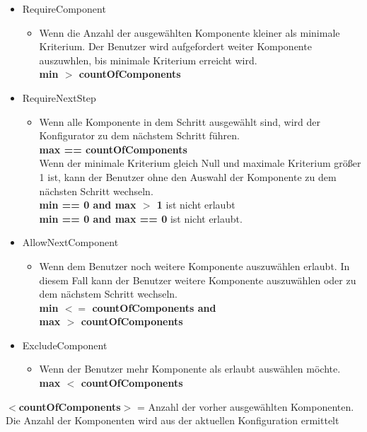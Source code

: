 \documentclass{article}
\begin{document}
\begin{itemize}
    \item RequireComponent 
    \begin{itemize}
        \item Wenn die Anzahl der ausgewählten Komponente kleiner als minimale
        Kriterium. Der Benutzer wird aufgefordert weiter Komponente
        auszuwhlen, bis minimale Kriterium erreicht wird.\\
        \textbf{min $>$ countOfComponents}
    \end{itemize}
    \item RequireNextStep
        \begin{itemize}
            \item Wenn alle Komponente in dem Schritt ausgewählt sind, wird
            der Konfigurator zu dem nächstem Schritt führen.\\
            \textbf{max == countOfComponents}\\
            Wenn der minimale Kriterium gleich Null und maximale Kriterium
            größer 1 ist, kann der Benutzer ohne den Auswahl der
            Komponente zu dem nächsten Schritt wechseln.\\
            \textbf{min == 0 and max $>$ 1} ist nicht erlaubt\\
            \textbf{min == 0 and max == 0} ist nicht erlaubt.
        \end{itemize}
    \item AllowNextComponent
    \begin{itemize}
        \item  Wenn dem Benutzer noch weitere Komponente auszuwählen erlaubt.
        In diesem Fall kann der Benutzer weitere Komponente auszuwählen oder zu
        dem nächstem Schritt wechseln.\\
        \textbf{min $<=$ countOfComponents and\\ max $>$ countOfComponents}
    \end{itemize}
\item ExcludeComponent
    \begin{itemize}
        \item Wenn der Benutzer mehr Komponente als erlaubt auswählen
        möchte.\\
        \textbf{max $<$ countOfComponents}
    \end{itemize}
\end{itemize}

\noindent\textbf{$<$countOfComponents$>$} = Anzahl der vorher
ausgewählten Komponenten.
Die Anzahl der Komponenten wird aus der aktuellen Konfiguration ermittelt\\\\
\end{document}
